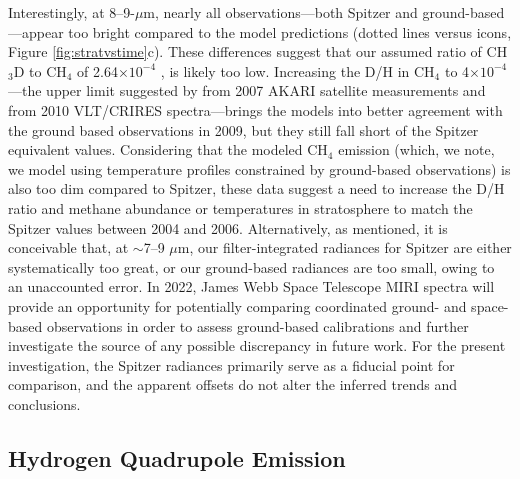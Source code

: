 \documentclass[twocolumn,10pt]{aastex631}
\begin{document}



Interestingly, at 8--9-$\mu$m, nearly all observations---both Spitzer and ground-based---appear too bright compared to the model predictions (dotted lines versus icons, Figure \ref{fig:stratvstime}c). These differences suggest that our assumed ratio of CH$_3$D to CH$_4$ of 2.64$\times10^{-4}$  \citep[from Herschel-PACS analysis,][]{feuchtgruber2013d}, is likely too low. Increasing the D/H in CH$_4$ to 4$\times10^{-4}$---the upper limit suggested by \citet{fletcher2010neptune} from 2007 AKARI satellite measurements and \citet{irwin2014line} from 2010 VLT/CRIRES spectra---brings the models into better agreement with the ground based observations in 2009, but they still fall short of the Spitzer equivalent values.  Considering that the modeled CH$_4$ emission (which, we note, we model using temperature profiles constrained by ground-based observations) is also too dim compared to Spitzer, these data suggest a need to increase the D/H ratio and methane abundance or temperatures in stratosphere to match the Spitzer values between 2004 and 2006.  Alternatively, as mentioned, it is conceivable that, at $\sim$7--9 $\mu$m, our filter-integrated radiances for Spitzer are either systematically too great, or our ground-based radiances are too small, owing to an unaccounted error. In 2022, James Webb Space Telescope MIRI spectra will provide an opportunity for potentially comparing coordinated ground- and space-based observations in order to assess ground-based calibrations and further investigate the source of any possible discrepancy in future work.  For the present investigation, the Spitzer radiances primarily serve as a fiducial point for comparison, and the apparent offsets do not alter the inferred trends and conclusions.

\subsection{Hydrogen Quadrupole Emission}\label{sec:quadrupole}
\end{document}
